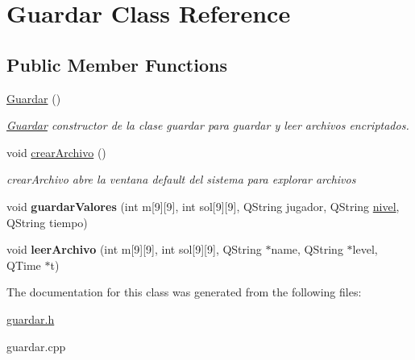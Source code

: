 \hypertarget{class_guardar}{\section{Guardar Class Reference}
\label{class_guardar}
}
\subsection*{Public Member Functions}
\begin{DoxyCompactItemize}
\item 
\hypertarget{class_guardar_a265efa37b91672b6040a27f2207192b7}{\hyperlink{class_guardar_a265efa37b91672b6040a27f2207192b7}{Guardar} ()}\label{class_guardar_a265efa37b91672b6040a27f2207192b7}

\begin{DoxyCompactList}\small\item\em \hyperlink{class_guardar}{Guardar} constructor de la clase guardar para guardar y leer archivos encriptados. \end{DoxyCompactList}\item 
\hypertarget{class_guardar_aa602d00edb44609652777954ad2f8c18}{void \hyperlink{class_guardar_aa602d00edb44609652777954ad2f8c18}{crear\-Archivo} ()}\label{class_guardar_aa602d00edb44609652777954ad2f8c18}

\begin{DoxyCompactList}\small\item\em crear\-Archivo abre la ventana default del sistema para explorar archivos \end{DoxyCompactList}\item 
\hypertarget{class_guardar_ab2a0427431816fd0c1138afb7410856c}{void {\bfseries guardar\-Valores} (int m\mbox{[}9\mbox{]}\mbox{[}9\mbox{]}, int sol\mbox{[}9\mbox{]}\mbox{[}9\mbox{]}, Q\-String jugador, Q\-String \hyperlink{classnivel}{nivel}, Q\-String tiempo)}\label{class_guardar_ab2a0427431816fd0c1138afb7410856c}

\item 
\hypertarget{class_guardar_ad1893652f3dad094f002e8415b20b67e}{void {\bfseries leer\-Archivo} (int m\mbox{[}9\mbox{]}\mbox{[}9\mbox{]}, int sol\mbox{[}9\mbox{]}\mbox{[}9\mbox{]}, Q\-String $\ast$name, Q\-String $\ast$level, Q\-Time $\ast$t)}\label{class_guardar_ad1893652f3dad094f002e8415b20b67e}

\end{DoxyCompactItemize}


The documentation for this class was generated from the following files\-:\begin{DoxyCompactItemize}
\item 
\hyperlink{guardar_8h}{guardar.\-h}\item 
guardar.\-cpp\end{DoxyCompactItemize}
